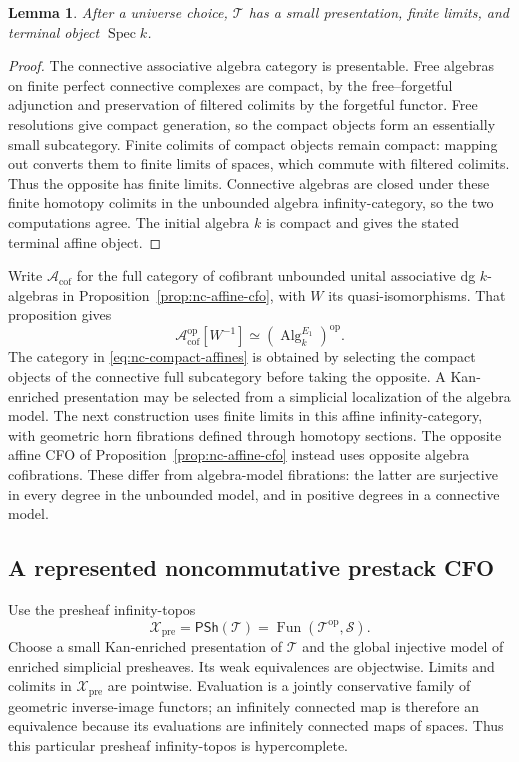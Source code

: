 \documentclass[12pt]{amsart}
\newtheorem{lem}[thm]{Lemma}
\theoremstyle{definition}
\theoremstyle{remark}
\numberwithin{equation}{section}
\newcommand{\PSh}{\mathsf{PSh}}
\newcommand{\op}{\mathrm{op}}
\DeclareMathOperator{\Spec}{Spec}
\DeclareMathOperator{\Fun}{Fun}
\begin{document}
\begin{lem}\label{lem:nc-affine-finite-limits}
After a universe choice, $\mathcal T$ has a small presentation,
finite limits, and terminal object $\Spec k$.
\end{lem}

\begin{proof}
The connective associative algebra category is presentable.
Free algebras on finite perfect connective complexes are compact,
by the free--forgetful adjunction and preservation of filtered
colimits by the forgetful functor. Free resolutions give compact
generation, so the compact objects form an essentially small
subcategory. Finite colimits of compact objects remain compact:
mapping out converts them to finite limits of spaces, which
commute with filtered colimits. Thus the opposite has finite
limits. Connective algebras are closed under these finite
homotopy colimits in the unbounded algebra infinity-category, so
the two computations agree. The initial algebra $k$ is compact
and gives the stated terminal affine object.
\end{proof}

Write $\mathscr A_{\mathrm{cof}}$ for the full category of
cofibrant unbounded unital associative dg $k$-algebras in
Proposition~\ref{prop:nc-affine-cfo}, with $W$ its
quasi-isomorphisms. That proposition gives
\[
 \mathscr A_{\mathrm{cof}}^{\op}[W^{-1}]
       \simeq(\operatorname{Alg}^{E_1}_k)^{\op}.
\]
The category in \eqref{eq:nc-compact-affines} is obtained by
selecting the compact objects of the connective full subcategory
before taking the opposite. A Kan-enriched presentation may be
selected from a simplicial localization of the algebra model.
The next construction uses finite limits in this affine
infinity-category, with geometric horn fibrations defined
through homotopy sections. The opposite affine CFO of
Proposition~\ref{prop:nc-affine-cfo} instead uses opposite
algebra cofibrations. These differ from algebra-model
fibrations: the latter are surjective in every degree
in the unbounded model, and in positive degrees in a
connective model.

\subsection{A represented noncommutative prestack CFO}

Use the presheaf infinity-topos
\[
 \mathcal X_{\mathrm{pre}}=\PSh(\mathcal T)
             =\Fun(\mathcal T^{\op},\mathcal S).
\]
Choose a small Kan-enriched presentation of $\mathcal T$ and the
global injective model of enriched simplicial presheaves. Its
weak equivalences are objectwise. Limits and colimits in
$\mathcal X_{\mathrm{pre}}$ are pointwise. Evaluation is a jointly
conservative family of geometric inverse-image functors; an
infinitely connected map is therefore an equivalence because its
evaluations are infinitely connected maps of spaces. Thus this
particular presheaf infinity-topos is hypercomplete.
\end{document}
